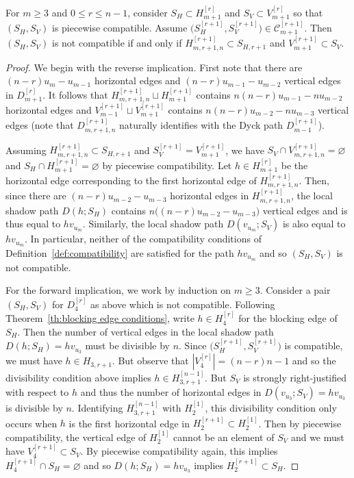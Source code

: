 \documentclass[smallextended,envcountsect,envcountsame]{svjour3}
\numberwithin{equation}{section}
\newcommand{\cC}{\mathcal{C}}
\begin{document}
\begin{corollary}
  \label{cor:piecewise not compatible}
  For $m\ge3$ and $0\le r\le n-1$, consider $S_H\subset H_{m+1}^{[r]}$ and $S_V\subset V_{m+1}^{[r]}$ so that $(S_H,S_V)$ is piecewise compatible.
  Assume $\big(S_H^{[r+1]},S_V^{[r+1]}\big)\in\cC_{m+1}^{[r+1]}$.
  Then $(S_H,S_V)$ is not compatible if and only if $H_{m,r+1,n}^{[r+1]}\subset S_{H,r+1}$ and $V_{m+1}^{[r+1]}\subset S_V$.
\end{corollary}
\begin{proof}
  We begin with the reverse implication.
  First note that there are $(n-r)u_m-u_{m-1}$ horizontal edges and $(n-r)u_{m-1}-u_{m-2}$ vertical edges in $D_{m+1}^{[r]}$. 
  It follows that $H_{m,r+1,n}^{[r+1]}\sqcup H_{m+1}^{[r+1]}$ contains $n(n-r)u_{m-1}-nu_{m-2}$ horizontal edges and $V_{m-1}^{[r+1]}\sqcup V_{m+1}^{[r+1]}$ contains $n(n-r)u_{m-2}-nu_{m-3}$ vertical edges (note that $D_{m,r+1,n}^{[r+1]}$ naturally identifies with the Dyck path $D_{m-1}^{[r+1]}$).

  Assuming $H_{m,r+1,n}^{[r+1]}\subset S_{H,r+1}$ and $S_V^{[r+1]}=V_{m+1}^{[r+1]}$, we have $S_V\cap V_{m,r+1,n}^{[r+1]}=\varnothing$ and $S_H\cap H_{m+1}^{[r+1]}=\varnothing$ by piecewise compatibility.
  Let $h\in H_{m+1}^{[r]}$ be the horizontal edge corresponding to the first horizontal edge of $H_{m,r+1,n}^{[r+1]}$.
  Then, since there are $(n-r)u_{m-2}-u_{m-3}$ horizontal edges in $H_{m,r+1,n}^{[r+1]}$, the local shadow path $D(h;S_H)$ contains $n\big((n-r)u_{m-2}-u_{m-3}\big)$ vertical edges and is thus equal to $hv_{u_m}$.
  Similarly, the local shadow path $D(v_{u_m};S_V)$ is also equal to $hv_{u_m}$.
  In particular, neither of the compatibility conditions of Definition~\ref{def:compatibility} are satisfied for the path $hv_{u_m}$ and so $(S_H,S_V)$ is not compatible.

  For the forward implication, we work by induction on $m\ge3$.
  Consider a pair $(S_H,S_V)$ for $D_4^{[r]}$ as above which is not compatible.
  Following Theorem~\ref{th:blocking edge conditions}, write $h\in H_4^{[r]}$ for the blocking edge of $S_H$.
  Then the number of vertical edges in the local shadow path $D(h;S_H)=hv_{u_3}$ must be divisible by $n$. 
  Since $\big(S_H^{[r+1]},S_V^{[r+1]}\big)$ is compatible, we must have $h\in H_{3,r+1}$.
  But observe that $|V_4^{[r]}|=(n-r)n-1$ and so the divisibility condition above implies $h\in H_{3,r+1}^{[n-1]}$.
  But $S_V$ is strongly right-justified with respect to $h$ and thus the number of horizontal edges in $D(v_{u_3};S_V)=hv_{u_3}$ is divisible by $n$.
  Identifying $H_{3,r+1}^{[n-1]}$ with $H_2^{[1]}$, this divisibility condition only occurs when $h$ is the first horizontal edge in $H_2^{[r+1]}\subset H_2^{[1]}$.
  Then by piecewise compatibility, the vertical edge of $H_2^{[1]}$ cannot be an element of $S_V$ and we must have $V_4^{[r+1]}\subset S_V$.
  By piecewise compatibility again, this implies $H_4^{[r+1]}\cap S_H=\varnothing$ and so $D(h;S_H)=hv_{u_3}$ implies $H_2^{[r+1]}\subset S_H$.


\end{proof}
\end{document}
